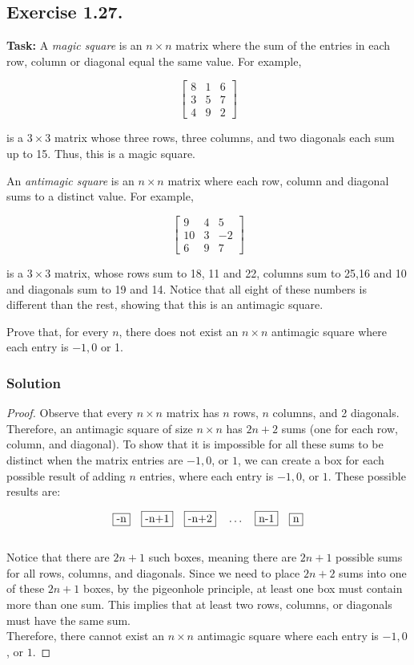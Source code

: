 \documentclass{article}
\begin{document}
\newpage

\subsection{Exercise 1.27.} 
\textbf{Task:} A \textit{magic square} is an $n \times n$ matrix where the sum of the entries in each row, column or diagonal equal the same value. For example,

\[
\begin{bmatrix}
    8 & 1 & 6 \\
    3 & 5 & 7 \\
    4 & 9 & 2
\end{bmatrix}
\]

is a $3 \times 3$ matrix whose three rows, three columns, and two diagonals each sum up to 15. Thus, this is a magic square.

An \textit{antimagic square} is an $n \times n$ matrix where each row, column and diagonal sums to a distinct value. For example, 

\[
\begin{bmatrix}
    9 & 4 & 5 \\
    10 & 3 & -2 \\
    6 & 9 & 7
\end{bmatrix}
\]

is a $3 \times 3$ matrix, whose rows sum to 18, 11 and 22, columns sum to 25,16 and 10 and diagonals sum to 19 and 14. Notice that all eight of these numbers is different than the rest, showing that this is an antimagic square.

Prove that, for every $n$, there does not exist an $n \times n$ antimagic square where each entry is $-1,0$ or 1.

\subsubsection*{Solution}

\begin{proof}
    Observe that every $n \times n$ matrix has $n$ rows, $n$ columns, and 2 diagonals. Therefore, an antimagic square of size $n \times n$ has $2n+2$ sums (one for each row, column, and diagonal). To show that it is impossible for all these sums to be distinct when the matrix entries are $-1, 0$, or $1$, we can create a box for each possible result of adding $n$ entries, where each entry is $-1, 0$, or $1$. These possible results are:

    \[
    \fbox{-n} \quad \fbox{-n+1} \quad \fbox{-n+2} \quad \dots \quad \fbox{n-1} \quad \fbox{n}
    \]\\

    Notice that there are $2n+1$ such boxes, meaning there are $2n+1$ possible sums for all rows, columns, and diagonals. Since we need to place $2n+2$ sums into one of these $2n+1$ boxes, by the pigeonhole principle, at least one box must contain more than one sum. This implies that at least two rows, columns, or diagonals must have the same sum.\\
    Therefore, there cannot exist an $n \times n$ antimagic square where each entry is $-1, 0$, or $1$.
\end{proof}
\end{document}
